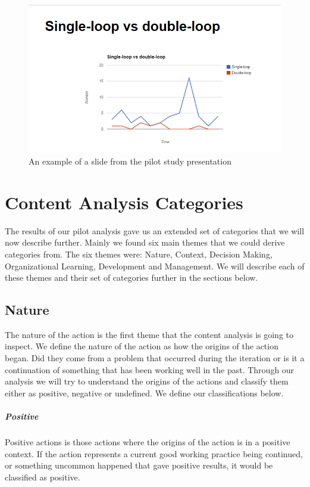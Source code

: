 \begin{figure}[!h]
	\centering
	\includegraphics[width=\textwidth]{figures/Pilot_loop.PNG}
	\caption{An example of a slide from the pilot study presentation }
	\label{figure:Pilot Slide}
\end{figure}

\chapter{Content Analysis Categories}\label{appendix:categories}
The results of our pilot analysis gave us an extended set of categories that we will now describe further. Mainly we found six main themes that we could derive categories from. The six themes were: Nature, Context, Decision Making, Organizational Learning, Development and Management. We will describe each of these themes and their set of categories further in the sections below.

\section{Nature}
The nature of the action is the first theme that the content analysis is going to inspect. We define the nature of the action as how the origins of the action began. Did they come from a problem that occurred during the iteration or is it a continuation of something that has been working well in the past. Through our analysis we will try to understand the origins of the actions and classify them either as positive, negative or undefined. We define our classifications below. 
\paragraph{Positive} Positive actions is those actions where the origins of the action is in a positive context. If the action represents a current good working practice being continued, or something uncommon happened that gave positive results, it would be classified as positive.

